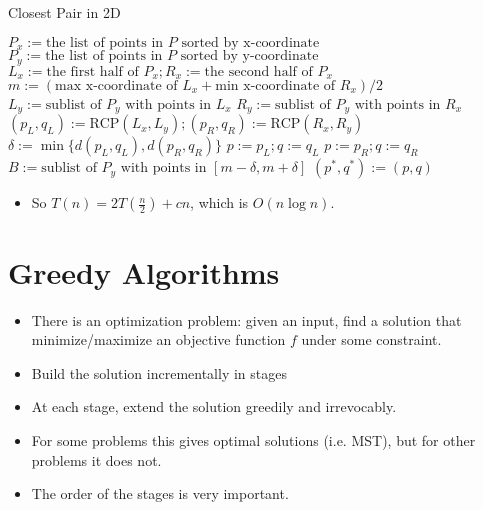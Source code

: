 \documentclass[a4paper]{article}
\begin{document}
\begin{algorithm}
\caption{Closest Pair in 2D}
\begin{algorithmic}[1]
\State $P_x:=\text{the list of points in }P\text{ sorted by x-coordinate}$
\State $P_y:=\text{the list of points in }P\text{ sorted by y-coordinate}$
\EndProcedure
{}
\EndIf
\State $L_x:=\text{the first half of }P_x;R_x:=\text{the second half of }P_x$
\State $m:=(\text{max x-coordinate of }L_x+\text{min x-coordinate of }R_x)/2$
\State $L_y:=\text{sublist of }P_y\text{ with points in }L_x$
\State $R_y:=\text{sublist of }P_y\text{ with points in }R_x$
\State $(p_L,q_L):=\text{RCP}(L_x,L_y);(p_R,q_R):=\text{RCP}(R_x,R_y)$
\State $\delta:=\min\{d(p_L,q_L),d(p_R,q_R)\}$
\State $p:=p_L;q:=q_L$
\Else
\State $p:=p_R;q:=q_R$
\EndIf
\State $B:=\text{sublist of }P_y\text{ with points in }[m-\delta,m+\delta]$
 $(p^*,q^*):=(p,q)$
\EndIf
\EndForeach
\EndForeach
\EndProcedure
\end{algorithmic}
\end{algorithm}
\begin{itemize}
    \item So $T(n)=2T(\frac{n}{2})+cn$, which is $O(n\log n)$.
\end{itemize}

\section{Greedy Algorithms}
\begin{itemize}
    \item There is an optimization problem: given an input, find a solution that minimize/maximize an objective function $f$ under some constraint.
    \item Build the solution incrementally in stages
    \item At each stage, extend the solution greedily and irrevocably.
    \item For some problems this gives optimal solutions (i.e. MST), but for other problems it does not.
    \item The order of the stages is very important.
\end{itemize}
\end{document}
